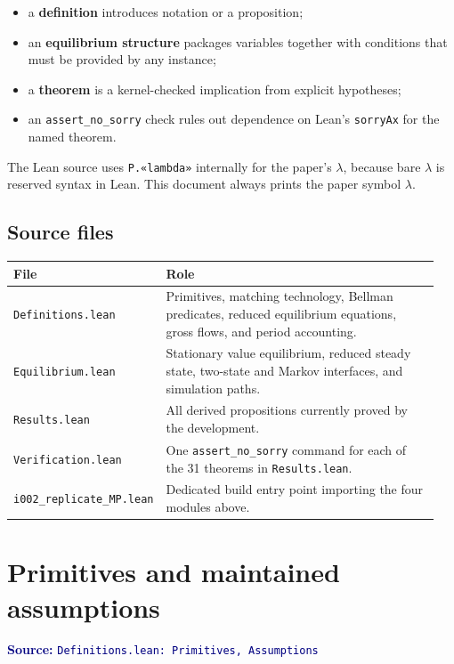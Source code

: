 \documentclass[11pt]{article}
\newcommand{\code}[1]{\texttt{#1}}
\newcommand{\leanfile}[1]{\texttt{#1}}
\newcommand{\source}[1]{\textcolor{navy}{\small\textbf{Source:} \leanfile{#1}}}
\begin{document}
\begin{itemize}
  \item a \textbf{definition} introduces notation or a proposition;
  \item an \textbf{equilibrium structure} packages variables together with conditions
        that must be provided by any instance;
  \item a \textbf{theorem} is a kernel-checked implication from explicit hypotheses;
  \item an \code{assert\_no\_sorry} check rules out dependence on Lean's
        \code{sorryAx} for the named theorem.
\end{itemize}

The Lean source uses \code{P.«lambda»} internally for the paper's $\lambda$, because
bare $\lambda$ is reserved syntax in Lean. This document always prints the paper
symbol $\lambda$.

\subsection{Source files}

\begin{longtable}{@{}p{0.29\linewidth}p{0.66\linewidth}@{}}
\toprule
\textbf{File} & \textbf{Role} \\
\midrule
\endhead
\leanfile{Definitions.lean} & Primitives, matching technology, Bellman predicates,
reduced equilibrium equations, gross flows, and period accounting. \\
\leanfile{Equilibrium.lean} & Stationary value equilibrium, reduced steady state,
two-state and Markov interfaces, and simulation paths. \\
\leanfile{Results.lean} & All derived propositions currently proved by the development. \\
\leanfile{Verification.lean} & One \code{assert\_no\_sorry} command for each of the
31 theorems in \leanfile{Results.lean}. \\
\leanfile{i002\_replicate\_MP.lean} & Dedicated build entry point importing the four
modules above. \\
\bottomrule
\end{longtable}

\section{Primitives and maintained assumptions}

\source{Definitions.lean: Primitives, Assumptions}
\end{document}
